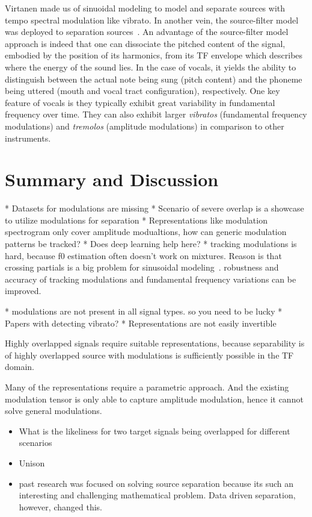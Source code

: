Virtanen made us of sinuoidal modeling \cite{virtanen00} to model and separate sources with tempo spectral modulation like vibrato.
In another vein, the source-filter model was deployed to separation sources~\cite{hennequin10}.
An advantage of the source-filter model approach is indeed that one can dissociate the pitched content of the signal, embodied by the position of its harmonics, from its TF envelope which describes where the energy of the sound lies. In the case of vocals, it yields the ability to distinguish between the actual note being sung (pitch content) and the phoneme being uttered (mouth and vocal tract configuration), respectively. One key feature of vocals is they typically exhibit great variability in fundamental frequency over time. They can also exhibit larger \textit{vibratos} (fundamental frequency modulations) and \textit{tremolos} (amplitude modulations) in comparison to other instruments.


\section{Summary and Discussion}

* Datasets for modulations are missing
* Scenario of severe overlap is a showcase to utilize modulations for separation
* Representations like modulation spectrogram only cover amplitude modualtions, how can generic modulation patterns be tracked?
* Does deep learning help here?
* tracking modulations is hard, because f0 estimation often doesn't work on mixtures. Reason is that crossing partials is a big problem for sinusoidal modeling~\cite{viste03}. 
robustness and accuracy of tracking modulations and fundamental frequency variations can be improved.

* modulations are not present in all signal types. so you need to be lucky 
* Papers with detecting vibrato?
* Representations are not easily invertible




Highly overlapped signals require suitable representations, because separability is of highly overlapped source with modulations is sufficiently possible in the TF domain.

Many of the representations require a parametric approach. And the existing modulation tensor is only able to capture amplitude modulation, hence it cannot solve general modulations.

\begin{itemize}
  \item What is the likeliness for two target signals being overlapped for different scenarios
  \item Unison
  \item past research was focused on solving source separation because its such an interesting and challenging mathematical problem. Data driven separation, however, changed this.
\end{itemize}
